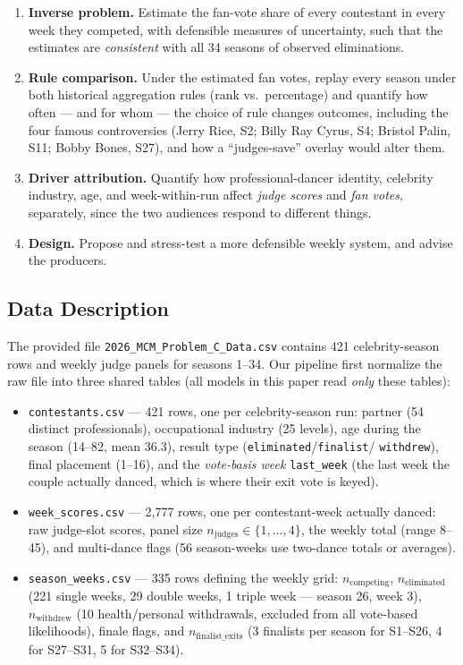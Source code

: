 \documentclass[11pt]{article}
\begin{document}
\begin{enumerate}[leftmargin=2em]
\item \textbf{Inverse problem.} Estimate the fan-vote share of every contestant in
every week they competed, with defensible measures of uncertainty, such that the
estimates are \emph{consistent} with all 34 seasons of observed eliminations.
\item \textbf{Rule comparison.} Under the estimated fan votes, replay every season
under both historical aggregation rules (rank vs.\ percentage) and quantify how
often --- and for whom --- the choice of rule changes outcomes, including the four
famous controversies (Jerry Rice, S2; Billy Ray Cyrus, S4; Bristol Palin, S11;
Bobby Bones, S27), and how a ``judges-save'' overlay would alter them.
\item \textbf{Driver attribution.} Quantify how professional-dancer identity,
celebrity industry, age, and week-within-run affect \emph{judge scores} and
\emph{fan votes}, separately, since the two audiences respond to different things.
\item \textbf{Design.} Propose and stress-test a more defensible weekly system, and
advise the producers.
\end{enumerate}

\subsection{Data Description}
\label{sec:data}

The provided file \texttt{2026\_MCM\_Problem\_C\_Data.csv} contains 421
celebrity-season rows and weekly judge panels for seasons 1--34. Our pipeline first
normalize the raw file into three shared tables (all models in this paper read
\emph{only} these tables):

\begin{itemize}[leftmargin=2em]
\item \texttt{contestants.csv} --- 421 rows, one per celebrity-season run: partner
(54 distinct professionals), occupational industry (25 levels), age during the
season (14--82, mean 36.3), result type (\texttt{eliminated}/\texttt{finalist}/%
\texttt{withdrew}), final placement (1--16), and the \emph{vote-basis week}
\texttt{last\_week} (the last week the couple actually danced, which is where
their exit vote is keyed).
\item \texttt{week\_scores.csv} --- 2{,}777 rows, one per contestant-week actually
danced: raw judge-slot scores, panel size $n_{\text{judges}} \in \{1,\dots,4\}$,
the weekly total (range 8--45), and multi-dance flags (56 season-weeks use
two-dance totals or averages).
\item \texttt{season\_weeks.csv} --- 335 rows defining the weekly grid:
$n_{\text{competing}}$, $n_{\text{eliminated}}$ (221 single weeks, 29 double weeks,
1 triple week --- season 26, week 3), $n_{\text{withdrew}}$ (10 health/personal
withdrawals, excluded from all vote-based likelihoods), finale flags, and
$n_{\text{finalist\_exits}}$ (3 finalists per season for S1--S26, 4 for S27--S31,
5 for S32--S34).
\end{itemize}
\end{document}
